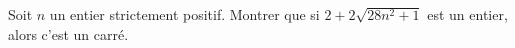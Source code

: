 Soit $n$ un entier strictement positif. Montrer que si $2 + 2\sqrt{28n^2 + 1}$ est un entier, alors c'est un carré.
